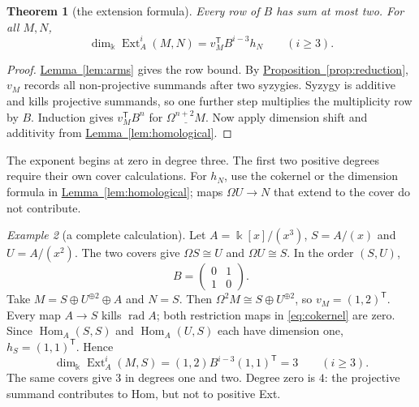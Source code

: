 \documentclass[reqno]{amsart}
\numberwithin{equation}{section}
\newtheorem{theorem}{Theorem}[section]
\newtheorem{proposition}[theorem]{Proposition}
\theoremstyle{definition}
\theoremstyle{remark}
\newtheorem{example}[theorem]{Example}
\DeclareMathOperator{\Hom}{Hom}
\DeclareMathOperator{\Ext}{Ext}
\DeclareMathOperator{\rad}{rad}
\newcommand{\Om}{\Omega}
\newcommand{\transpose}{^{\mathsf T}}
\newcommand{\kk}{\Bbbk}
\newcommand{\kdim}{\dim_{\kk}}
\newcommand{\lemref}[1]{\hyperref[#1]{Lemma~\ref*{#1}}}
\newcommand{\propref}[1]{\hyperref[#1]{Proposition~\ref*{#1}}}
\begin{document}
%

\begin{theorem}[the extension formula]\label{thm:matrix}
Every row of \(B\) has sum at most two. For all \(M,N\),
\[
 \kdim\Ext_A^i(M,N)=v_M\transpose B^{i-3}h_N\qquad(i\ge3).
\]
\end{theorem}
\begin{proof}
\lemref{lem:arms} gives the row bound. By \propref{prop:reduction}, \(v_M\) records all non-projective summands after two syzygies. Syzygy is additive and kills projective summands, so one further step multiplies the multiplicity row by \(B\). Induction gives \(v_M\transpose{}B^n\) for \(\underline{\Om^{n+2}M}\). Now apply dimension shift and additivity from \lemref{lem:homological}.
\end{proof}

The exponent begins at zero in degree three. The first two positive degrees require their own cover calculations. For \(h_N\), use the cokernel or the dimension formula in \lemref{lem:homological}; maps \(\Om U\to N\) that extend to the cover do not contribute.

\begin{example}[a complete calculation]\label{ex:truncated-loop}
Let \(A=\kk[x]/(x^3)\), \(S=A/(x)\) and \(U=A/(x^2)\). The two covers give \(\Om S\cong U\) and \(\Om U\cong S\). In the order \((S,U)\),
\[
 B=\begin{pmatrix}0&1\\1&0\end{pmatrix}.
\]
Take \(M=S\oplus U^{\oplus2}\oplus A\) and \(N=S\). Then \(\Om^2M\cong S\oplus U^{\oplus2}\), so \(v_M=(1,2)\transpose\). Every map \(A\to S\) kills \(\rad A\); both restriction maps in \eqref{eq:cokernel} are zero. Since \(\Hom_A(S,S)\) and \(\Hom_A(U,S)\) each have dimension one, \(h_S=(1,1)\transpose\). Hence
\[
 \kdim\Ext_A^i(M,S)=(1,2)B^{i-3}(1,1)\transpose=3\qquad(i\ge3).
\]
The same covers give \(3\) in degrees one and two. Degree zero is \(4\): the projective summand contributes to Hom, but not to positive Ext.
\end{example}
\end{document}
